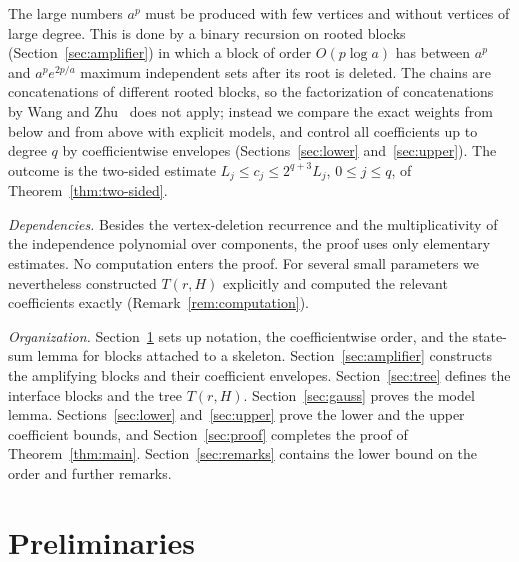 \documentclass[11pt]{amsart}
\theoremstyle{definition}
\theoremstyle{remark}
\numberwithin{equation}{section}
\begin{document}
The large numbers $a^p$ must be produced with few vertices and without vertices of large degree. This is done by a binary recursion on rooted blocks (Section~\ref{sec:amplifier}) in which a block of order $O(p\log a)$ has between $a^p$ and $a^pe^{2p/a}$ maximum independent sets after its root is deleted. The chains are concatenations of different rooted blocks, so the factorization of concatenations by Wang and Zhu~\cite[Theorem~3.1]{WZ} does not apply; instead we compare the exact weights from below and from above with explicit models, and control all coefficients up to degree $q$ by coefficientwise envelopes (Sections~\ref{sec:lower} and~\ref{sec:upper}). The outcome is the two-sided estimate $L_j\le c_j\le 2^{q+3}L_j$, $0\le j\le q$, of Theorem~\ref{thm:two-sided}.

\smallskip
\noindent\emph{Dependencies.} Besides the vertex-deletion recurrence and the multiplicativity of the independence polynomial over components, the proof uses only elementary estimates. No computation enters the proof. For several small parameters we nevertheless constructed $T(r,H)$ explicitly and computed the relevant coefficients exactly (Remark~\ref{rem:computation}).

\smallskip
\noindent\emph{Organization.} Section~\ref{sec:prelim} sets up notation, the coefficientwise order, and the state-sum lemma for blocks attached to a skeleton. Section~\ref{sec:amplifier} constructs the amplifying blocks and their coefficient envelopes. Section~\ref{sec:tree} defines the interface blocks and the tree $T(r,H)$. Section~\ref{sec:gauss} proves the model lemma. Sections~\ref{sec:lower} and~\ref{sec:upper} prove the lower and the upper coefficient bounds, and Section~\ref{sec:proof} completes the proof of Theorem~\ref{thm:main}. Section~\ref{sec:remarks} contains the lower bound on the order and further remarks.

\section{Preliminaries}\label{sec:prelim}
\end{document}
